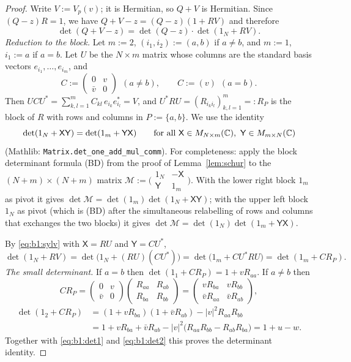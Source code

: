 \begin{proof}
Write $V:=V_p(v)$; it is Hermitian, so $Q+V$ is Hermitian. Since $(Q-z)R=1$, we have $Q+V-z=(Q-z)(1+RV)$ and therefore
\begin{equation}\label{eq:b1:det1}
\det(Q+V-z)=\det(Q-z)\cdot\det(1_N+RV).
\end{equation}
\emph{Reduction to the block.} Let $m:=2$, $(i_1,i_2):=(a,b)$ if $a\ne b$, and $m:=1$, $i_1:=a$ if $a=b$. Let $U$ be the $N\times m$ matrix whose columns are the
standard basis vectors $e_{i_1},\dots,e_{i_m}$, and
\[
C:=\begin{pmatrix}0&v\\ \bar v&0\end{pmatrix}\ \ (a\ne b),\qquad C:=(v)\ \ (a=b).
\]
Then $UCU^*=\sum_{k,l=1}^mC_{kl}\,e_{i_k}e_{i_l}^*=V$, and $U^*RU=(R_{i_ki_l})_{k,l=1}^m=:R_P$ is the block of $R$ with rows and columns in $P:=\{a,b\}$.
We use the identity
\begin{equation}\label{eq:b1:sylv}
\det(1_N+\mathsf X\mathsf Y)=\det(1_m+\mathsf Y\mathsf X)\qquad\text{for all }\mathsf X\in M_{N\times m}(\mathbb{C}),\ \mathsf Y\in M_{m\times N}(\mathbb{C})
\end{equation}
(Mathlib: \texttt{Matrix.det\_one\_add\_mul\_comm}). For completeness: apply the block determinant formula \textup{(BD)} from the proof of
Lemma~\ref{lem:schur} to the $(N+m)\times(N+m)$ matrix $\mathcal M:=\big(\begin{smallmatrix}1_N&-\mathsf X\\ \mathsf Y&1_m\end{smallmatrix}\big)$. With the
lower right block $1_m$ as pivot it gives $\det\mathcal M=\det(1_m)\det(1_N+\mathsf X\mathsf Y)$; with the upper left block $1_N$ as pivot (which is
\textup{(BD)} after the simultaneous relabelling of rows and columns that exchanges the two blocks) it gives $\det\mathcal M=\det(1_N)\det(1_m+\mathsf Y\mathsf X)$.

By \eqref{eq:b1:sylv} with $\mathsf X=RU$ and $\mathsf Y=CU^*$,
\begin{equation}\label{eq:b1:det2}
\det(1_N+RV)=\det\big(1_N+(RU)(CU^*)\big)=\det\big(1_m+CU^*RU\big)=\det(1_m+CR_P).
\end{equation}
\emph{The small determinant.} If $a=b$ then $\det(1_1+CR_P)=1+vR_{aa}$. If $a\ne b$ then
\[
CR_P=\begin{pmatrix}0&v\\ \bar v&0\end{pmatrix}\begin{pmatrix}R_{aa}&R_{ab}\\ R_{ba}&R_{bb}\end{pmatrix}
=\begin{pmatrix}vR_{ba}&vR_{bb}\\ \bar vR_{aa}&\bar vR_{ab}\end{pmatrix},
\]
\begin{align*}
\det(1_2+CR_P)&=(1+vR_{ba})(1+\bar vR_{ab})-|v|^2R_{aa}R_{bb}\\
&=1+vR_{ba}+\bar vR_{ab}-|v|^2\big(R_{aa}R_{bb}-R_{ab}R_{ba}\big)=1+u-w .
\end{align*}
Together with \eqref{eq:b1:det1} and \eqref{eq:b1:det2} this proves the determinant identity.


\end{proof}
